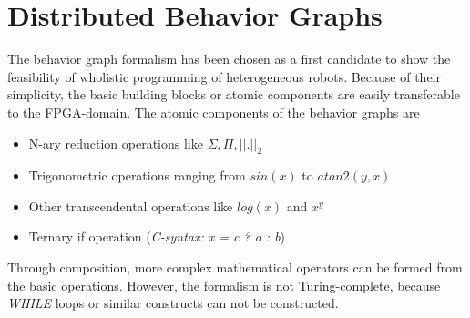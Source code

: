 \documentclass[a4paper,twocolumn]{esapub2005} %
\begin{document}

\section{Distributed Behavior Graphs}
The behavior graph formalism has been chosen as a first candidate to show the feasibility of wholistic programming of heterogeneous robots.
Because of their simplicity, the basic building blocks or atomic components are easily transferable to the FPGA-domain.
The atomic components of the behavior graphs are
\begin{itemize}
    \item N-ary reduction operations like $\Sigma,\Pi,{||.||}_{2}$
    \item Trigonometric operations ranging from $sin(x)$ to $atan2(y,x)$
    \item Other transcendental operations like $log(x)$ and $x^y$
    \item Ternary if operation (\emph{C-syntax: x = c ? a : b})
\end{itemize}
Through composition, more complex mathematical operators can be formed from the basic operations.
However, the formalism is not Turing-complete, because \emph{WHILE} loops or similar constructs can not be constructed.
\end{document}
